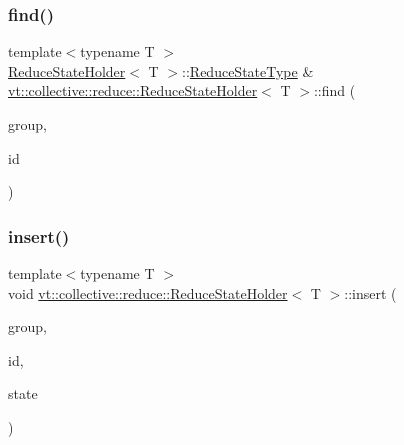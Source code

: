 \subsubsection{\texorpdfstring{find()}{find()}}
{\footnotesize\ttfamily template$<$typename T $>$ \\
\hyperlink{structvt_1_1collective_1_1reduce_1_1_reduce_state_holder}{Reduce\+State\+Holder}$<$ T $>$\+::\hyperlink{structvt_1_1collective_1_1reduce_1_1_reduce_state_holder_a6333d237936c835115b19a7421edf6ec}{Reduce\+State\+Type} \& \hyperlink{structvt_1_1collective_1_1reduce_1_1_reduce_state_holder}{vt\+::collective\+::reduce\+::\+Reduce\+State\+Holder}$<$ T $>$\+::find (\begin{DoxyParamCaption}\item[{\hyperlink{namespacevt_a27b5e4411c9b6140c49100e050e2f743}{Group\+Type}}]{group,  }\item[{\hyperlink{structvt_1_1collective_1_1reduce_1_1_reduce_state_holder_a783eeed6422fcc71cea89deca5ed8f08}{Reduce\+I\+D\+Type} const \&}]{id }\end{DoxyParamCaption})\hspace{0.3cm}{\ttfamily [static]}}

\mbox{\label{structvt_1_1collective_1_1reduce_1_1_reduce_state_holder_a562d495edb0992a049e052b939945029}} 
\subsubsection{\texorpdfstring{insert()}{insert()}}
{\footnotesize\ttfamily template$<$typename T $>$ \\
void \hyperlink{structvt_1_1collective_1_1reduce_1_1_reduce_state_holder}{vt\+::collective\+::reduce\+::\+Reduce\+State\+Holder}$<$ T $>$\+::insert (\begin{DoxyParamCaption}\item[{\hyperlink{namespacevt_a27b5e4411c9b6140c49100e050e2f743}{Group\+Type}}]{group,  }\item[{\hyperlink{structvt_1_1collective_1_1reduce_1_1_reduce_state_holder_a783eeed6422fcc71cea89deca5ed8f08}{Reduce\+I\+D\+Type} const \&}]{id,  }\item[{\hyperlink{structvt_1_1collective_1_1reduce_1_1_reduce_state_holder_a6333d237936c835115b19a7421edf6ec}{Reduce\+State\+Type} \&\&}]{state }\end{DoxyParamCaption})\hspace{0.3cm}{\ttfamily [static]}}



